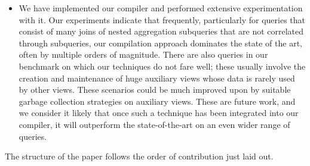 \begin{itemize}
\item
We have implemented our compiler and performed extensive experimentation with it. Our experiments
indicate that frequently, particularly for queries that consist of many joins of nested aggregation
subqueries that are not correlated through subqueries, our compilation approach dominates the
state of the art, often by multiple orders of magnitude. There are also queries in our benchmark
on which our techniques do not fare well; these usually involve the creation and maintenance of huge
auxiliary views whose data is rarely used by other views. These scenarios could be much improved upon
by suitable garbage collection strategies on auxiliary views. These are future work, and we consider
it likely that once such a technique has been integrated into our compiler, it will outperform the
state-of-the-art on an even wider range of queries.
\end{itemize}


The structure of the paper follows the order of contribution just laid out.















